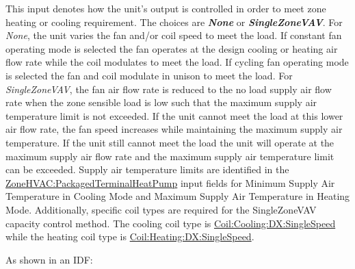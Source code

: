 This input denotes how the unit's output is controlled in order to meet zone heating or cooling requirement. The choices are \textbf{\emph{None}} or \textbf{\emph{SingleZoneVAV}}. For \emph{None}, the unit varies the fan and/or coil speed to meet the load. If constant fan operating mode is selected the fan operates at the design cooling or heating air flow rate while the coil modulates to meet the load. If cycling fan operating mode is selected the fan and coil modulate in unison to meet the load. For \emph{SingleZoneVAV}, the fan air flow rate is reduced to the no load supply air flow rate when the zone sensible load is low such that the maximum supply air temperature limit is not exceeded. If the unit cannot meet the load at this lower air flow rate, the fan speed increases while maintaining the maximum supply air temperature. If the unit still cannot meet the load the unit will operate at the maximum supply air flow rate and the maximum supply air temperature limit can be exceeded. Supply air temperature limits are identified in the \hyperref[zonehvacpackagedterminalheatpump]{ZoneHVAC:PackagedTerminalHeatPump} input fields for Minimum Supply Air Temperature in Cooling Mode and Maximum Supply Air Temperature in Heating Mode. Additionally, specific coil types are required for the SingleZoneVAV capacity control method. The cooling coil type is \hyperref[coilcoolingdxsinglespeed]{Coil:Cooling:DX:SingleSpeed} while the heating coil type is \hyperref[coilheatingdxsinglespeed]{Coil:Heating:DX:SingleSpeed}.

As shown in an IDF:

